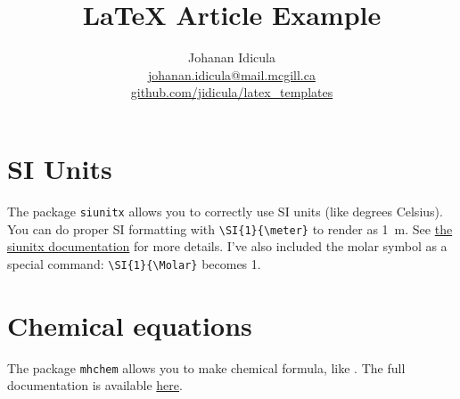 \documentclass[12pt, oneside]{article}        %
\title{\textbf{\LaTeX{} Article Example}}
\author{Johanan Idicula
  \\ \href{mailto:johanan.idicula@mail.mcgill.ca}{johanan.idicula@mail.mcgill.ca}
  \\ \href{https://github.com/jidicula/latex_templates}{github.com/jidicula/latex\_templates}
	}
\begin{document}
\maketitle
\section{SI Units}

The package \texttt{siunitx} allows you to correctly use SI units (like degrees Celsius). You can do proper SI formatting with \texttt{\textbackslash SI\{1\}\{\textbackslash meter\}} to render as \SI{1}{\meter}. See \href{http://ctan.mirror.rafal.ca/macros/latex/contrib/siunitx/siunitx.pdf}{the siunitx documentation} for more details. I've also included the molar symbol as a special command: \texttt{\textbackslash SI\{1\}\{\textbackslash Molar\}} becomes \SI{1}{\Molar}.

\section{Chemical equations}

The package \texttt{mhchem} allows you to make chemical formula, like . The full documentation is available \href{ftp://www.ctan.org/tex-archive/macros/latex/contrib/mhchem/mhchem.pdf}{here}.
\end{document}
